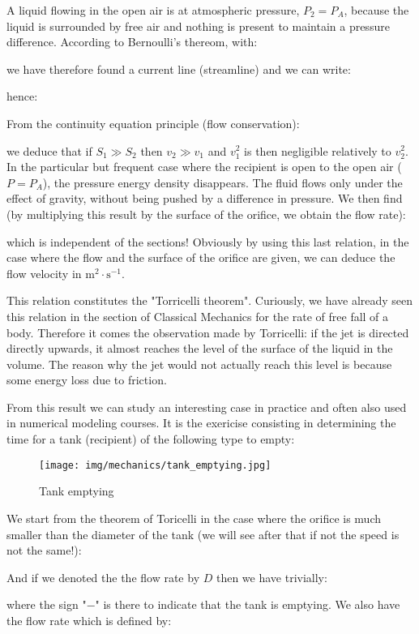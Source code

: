 	A liquid flowing in the open air is at atmospheric pressure, $P_2=P_A$, because the liquid is surrounded by free air and nothing is present to maintain a pressure difference. According to Bernoulli's thereom, with:
	
	we have therefore found a current line (streamline) and we can write:
	
	hence:
	
	From the continuity equation principle (flow conservation):
	
	 we deduce that if $S_1\gg S_2$ then $v_2\gg v_1$ and $v_1^2$ is then negligible relatively to $v_2^2$. In the particular but frequent case where the recipient is open to the open air ($P=P_A$), the pressure energy density disappears. The fluid flows only under the effect of gravity, without being pushed by a difference in pressure. We then find (by multiplying this result by the surface of the orifice, we obtain the flow rate):
	
	which is independent of the sections! Obviously by using this last relation, in the case where the flow and the surface of the orifice are given, we can deduce the flow velocity in $\text{m}^2\cdot \text{s}^{-1}$.

	This relation constitutes the "Torricelli theorem". Curiously, we have already seen this relation in the section of Classical Mechanics for the rate of free fall of a body. Therefore it comes the observation made by Torricelli: if the jet is directed directly upwards, it almost reaches the level of the surface of the liquid in the volume. The reason why the jet would not actually reach this level is because some energy loss due to friction.
	
	From this result we can study an interesting case in practice and often also used in numerical modeling courses. It is the exericise consisting in determining the time for a tank (recipient) of the following type to empty:
	\begin{figure}[H]
		\centering
		\texttt{[image: img/mechanics/tank\_emptying.jpg]}
		\caption{Tank emptying}
	\end{figure}
	We start from the theorem of Toricelli in the case where the orifice is much smaller than the diameter of the tank (we will see after that if not the speed is not the same!):
	
	And if we denoted the the flow rate by $D$ then we have trivially:
	
	where the sign "$-$" is there to indicate that the tank is emptying. We also have the flow rate which is defined by:
	
